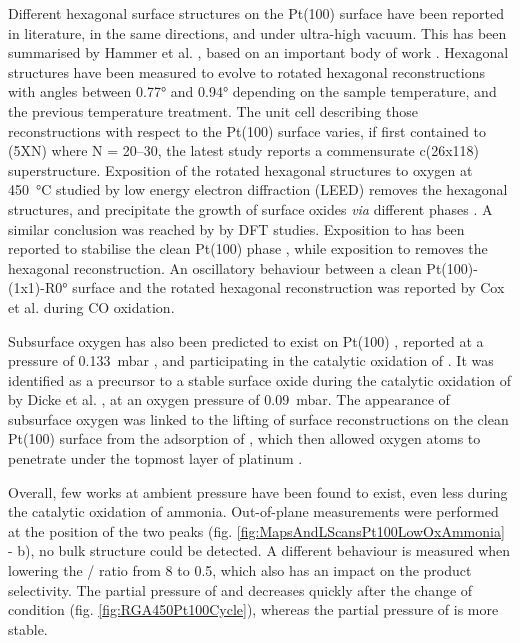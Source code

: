 Different hexagonal surface structures on the Pt(100) surface have been reported in literature, in the same directions, and under ultra-high vacuum.
This has been summarised by Hammer et al. \parencite*{Hammer2016}, based on an important body of work \parencite{Heilmann1979, Vanhove1981, Heinz1982, Mase1992, Kuhnke1992, Borg1994, VanBeurden2004, Havu2010}.
Hexagonal structures have been measured to evolve to rotated hexagonal reconstructions with angles between \ang{0.77} and \ang{0.94} depending on the sample temperature, and the previous temperature treatment.
The unit cell describing those reconstructions with respect to the Pt(100) surface varies, if first contained to (5XN) where N = 20–30, the latest study reports a commensurate c(26x118) superstructure.
Exposition of the rotated hexagonal structures to oxygen at \qty{450}{\degreeCelsius} studied by low energy electron diffraction (LEED) removes the hexagonal structures, and precipitate the growth of surface oxides \textit{via} different phases \parencite{BradleyShumbera2007, BradleyShumbera2007a}.
A similar conclusion was reached by \cite{Deskins2005} by DFT studies.
Exposition to  has been reported to stabilise the clean Pt(100) phase \parencite{Heinz1982}, while exposition to  removes the hexagonal reconstruction.
An oscillatory behaviour between a clean Pt(100)-(1x1)-R\ang{0} surface and the rotated hexagonal reconstruction was reported by Cox et al. \parencite*{Cox1983} during CO oxidation.

Subsurface oxygen has also been predicted to exist on Pt(100) \parencite{Gu2007}, reported at a pressure of \qty{0.133}{\milli\bar} \parencite{McMillan2005}, and participating in the catalytic oxidation of .
It was identified as a precursor to a stable surface oxide during the catalytic oxidation of  by Dicke et al. \parencite*{Dicke2000}, at an oxygen pressure of \qty{0.09}{\milli\bar}.
The appearance of subsurface oxygen was linked to the lifting of surface reconstructions on the clean Pt(100) surface from the adsorption of , which then allowed oxygen atoms to penetrate under the topmost layer of platinum \parencite{Rotermund1993, Lauterbach1994}.

Overall, few works at ambient pressure have been found to exist, even less during the catalytic oxidation of ammonia.
Out-of-plane measurements were performed at the position of the two peaks (fig. \ref{fig:MapsAndLScansPt100LowOxAmmonia} - b), no bulk structure could be detected.
A different behaviour is measured when lowering the / ratio from \num{8} to \num{0.5}, which also has an impact on the product selectivity.
The partial pressure of  and  decreases quickly after the change of condition (fig. \ref{fig:RGA450Pt100Cycle}), whereas the partial pressure of  is more stable.

